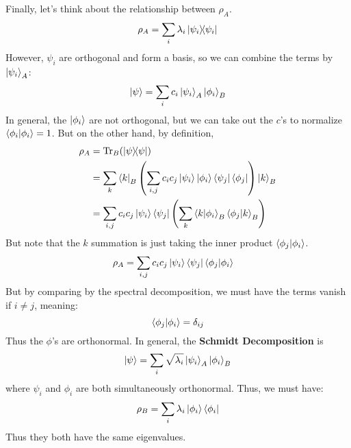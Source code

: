 Finally, let's think about the relationship between $\rho_A$.
\[ \rho_A = \sum_i \lambda_i \ketbra{\psi_i}{\psi_i} \]
However, $\psi_i$ are orthogonal and form a basis, so we can combine the terms by $\ket{\psi_i}_A$:
\[ \ket{\psi} = \sum_i c_i \ket{\psi_i}_{A} \ket{\phi_i}_B \]
In general, the $\ket{\phi_i}$ are not orthogonal, but we can take out the $c$'s to normalize $\braket{\phi_i}{\phi_i} = 1$.
But on the other hand, by definition,
\begin{align*}
    \rho_A &= \Tr_B(\ketbra{\psi}{\psi}) \\
    &= \sum_k \bra{k}_B \qty(\sum_{i,j} c_i c_j \ket{\psi_i} \ket{\phi_i} \bra{\psi_j} \bra{\phi_j}) \ket{k}_B \\
    &= \sum_{i,j} c_i c_j \ket{\psi_i} \bra{\psi_j} \qty(\sum_k  \braket{k}{\phi_i}_B \braket{\phi_j}{k}_B)
\end{align*}
But note that the $k$ summation is just taking the inner product $\braket{\phi_j}{\phi_i}$.
\begin{align*}
    \rho_A &= \sum_{i, j}  c_i c_j \ket{\psi_i}\bra{\psi_j} \braket{\phi_j}{\phi_i}
\end{align*}
But by comparing by the spectral decomposition, we must have the terms vanish if $i \neq j$, meaning:
\[ \braket{\phi_j}{\phi_i} = \delta_{ij} \]
Thus the $\phi$'s are orthonormal. In general, the \textbf{Schmidt Decomposition} is
\[ \ket{\psi} = \sum_i \sqrt{\lambda_i} \ket{\psi_i}_A \ket{\phi_i}_B \]
where $\psi_i$ and $\phi_i$ are both simultaneously orthonormal. Thus, we must have:
\[ \rho_B = \sum_i \lambda_i \ket{\phi_i}\bra{\phi_i} \]
Thus they both have the same eigenvalues.

